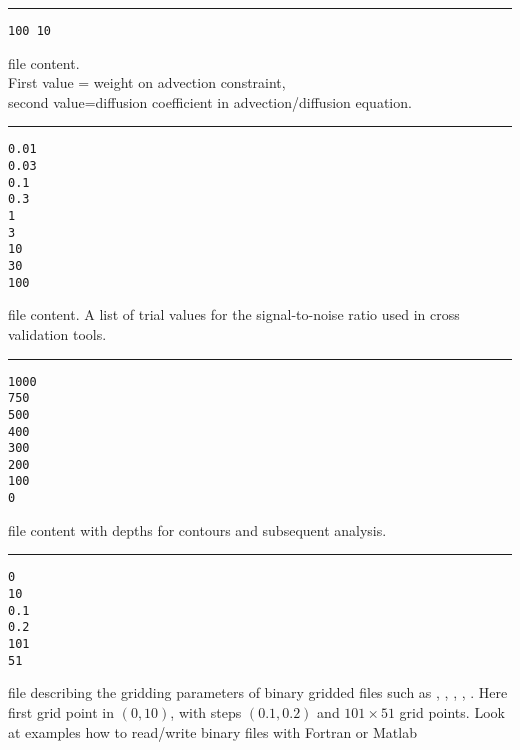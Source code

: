 \begin{multicols}{2}

\begin{minipage}{.5\textwidth}
\rule{\textwidth}{10pt}
{\scriptsize{
\begin{verbatim}
100 10
\end{verbatim}
}}
\vspace*{-0.5cm}
\makebox[\textwidth]{\hrulefill}

{ file content. \\
First value = weight on advection constraint,\\
second value=diffusion coefficient in advection/diffusion equation.}
\end{minipage}

\begin{minipage}{.5\textwidth}
\rule{\textwidth}{10pt}
{\scriptsize{
\begin{verbatim}
0.01
0.03
0.1
0.3
1
3
10
30
100
\end{verbatim}
}}
\vspace*{-0.5cm}
\makebox[\textwidth]{\hrulefill}
{ file content. A list of trial values for the signal-to-noise ratio used in cross validation tools.}
\end{minipage}

\begin{minipage}{.5\textwidth}
\rule{\textwidth}{10pt}
{\scriptsize{
\begin{verbatim}
1000
750
500
400
300
200
100
0
\end{verbatim}
}}
\vspace*{-0.5cm}
\makebox[\textwidth]{\hrulefill}
{ file content with depths for contours and subsequent analysis.}
\end{minipage}

\begin{minipage}{.5\textwidth}
\rule{\textwidth}{10pt}
{\scriptsize{
\begin{verbatim}
0
10
0.1
0.2
101
51
\end{verbatim}
}}
\vspace*{-0.5cm}
\makebox[\textwidth]{\hrulefill}
{ file describing the gridding parameters of binary gridded files such as , , ,  , . Here first grid point in $(0,10)$, with steps $(0.1,0.2)$ and $101 \times 51$ grid points. Look at examples how to read/write binary files with Fortran or Matlab}
\end{minipage}

\end{multicols}


